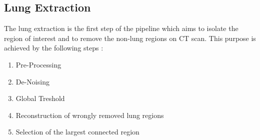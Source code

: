 \documentclass{standalone}
\begin{document}
	\subsection{Lung Extraction}
	
	The lung extraction is the first step of the pipeline which aims to isolate the region of interest and to remove the non-lung regions on CT scan. 
	This purpose is achieved by the following steps : 
	
	\begin{enumerate}
		\item Pre-Processing
		
		\item De-Noising
		
		\item Global Treshold
		
		\item Reconstruction of wrongly removed lung regions
		
		\item Selection of the largest connected region
	\end{enumerate}

	
		
\end{document}
